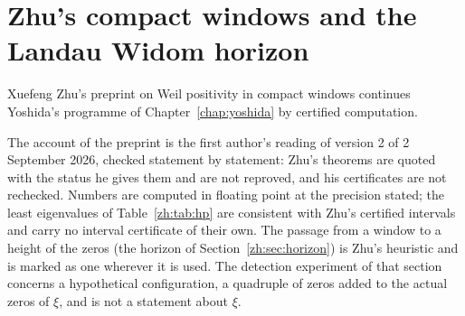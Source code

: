 \chapter{Zhu's compact windows and the Landau Widom horizon}\label{chap:zhu}\label{zh:chapter}

Xuefeng Zhu's preprint on Weil positivity in compact windows \cite{Zhu26} continues Yoshida's programme of Chapter~\ref{chap:yoshida} by certified computation.

The account of the preprint is the first author's reading of version 2 of 2 September 2026, checked statement by statement: Zhu's theorems are quoted with the status he gives them and are not reproved, and his certificates are not rechecked. Numbers are computed in floating point at the precision stated; the least eigenvalues of Table~\ref{zh:tab:hp} are consistent with Zhu's certified intervals and carry no interval certificate of their own. The passage from a window to a height of the zeros (the horizon of Section~\ref{zh:sec:horizon}) is Zhu's heuristic and is marked as one wherever it is used. The detection experiment of that section concerns a hypothetical configuration, a quadruple of zeros added to the actual zeros of $\xi$, and is not a statement about $\xi$.
